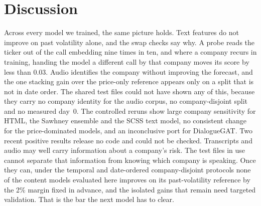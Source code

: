 \section{Discussion}
\label{sec:discussion}

Across every model we trained, the same picture holds. Text features do not improve
on past volatility alone, and the swap checks say why. A probe reads the ticker
out of the call embedding nine times in ten, and where a company recurs in
training, handing the model a different call by that company moves its score by
less than 0.03. Audio identifies the company without improving the forecast, and
the one stacking gain over the price-only reference appears only on a split that
is not in date order. The shared test files could not have shown any of this, because
they carry no company identity for the audio corpus, no company-disjoint split
and no measured day~0. The controlled reruns show large company
sensitivity for HTML, the Sawhney ensemble and the SCSS text model, no
consistent change for the price-dominated models, and an inconclusive port for
DialogueGAT. Two recent positive results \citep{soundofrisk2025,cao2024ecc}
release no code and could not be checked. Transcripts and audio may well
carry information about a company's risk. The test files in use cannot separate that
information from knowing which company is speaking. Once they can, under the
temporal and date-ordered company-disjoint protocols none of the content models
evaluated here improves on its past-volatility reference by the 2\% margin
fixed in advance, and the isolated gains that remain need targeted
validation. That is the bar the next model has to clear.
